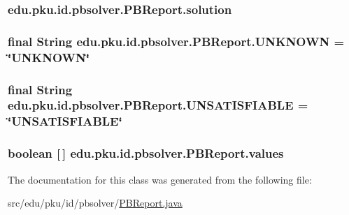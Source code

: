 \label{classedu_1_1pku_1_1id_1_1pbsolver_1_1_p_b_report_a94d85825eea60ee1d00b0b8df185b0f3}
\hypertarget{classedu_1_1pku_1_1id_1_1pbsolver_1_1_p_b_report_ab65beac0d1fd5ae85ac536441e3779a8}{
\subsubsection[{solution}]{ {\bf edu.pku.id.pbsolver.PBReport.solution}}}
\label{classedu_1_1pku_1_1id_1_1pbsolver_1_1_p_b_report_ab65beac0d1fd5ae85ac536441e3779a8}
\hypertarget{classedu_1_1pku_1_1id_1_1pbsolver_1_1_p_b_report_abf68ce33fec835012c92fa764c6b3bf9}{
\subsubsection[{UNKNOWN}]{\setlength{\rightskip}{0pt plus 5cm}final String {\bf edu.pku.id.pbsolver.PBReport.UNKNOWN} = \char`\"{}UNKNOWN\char`\"{}}}
\label{classedu_1_1pku_1_1id_1_1pbsolver_1_1_p_b_report_abf68ce33fec835012c92fa764c6b3bf9}
\hypertarget{classedu_1_1pku_1_1id_1_1pbsolver_1_1_p_b_report_ad7f88216510297f2b6b6ed96a1672ea3}{
\subsubsection[{UNSATISFIABLE}]{\setlength{\rightskip}{0pt plus 5cm}final String {\bf edu.pku.id.pbsolver.PBReport.UNSATISFIABLE} = \char`\"{}UNSATISFIABLE\char`\"{}}}
\label{classedu_1_1pku_1_1id_1_1pbsolver_1_1_p_b_report_ad7f88216510297f2b6b6ed96a1672ea3}
\hypertarget{classedu_1_1pku_1_1id_1_1pbsolver_1_1_p_b_report_a537a45fd8738f95aea6e043fb58bacfe}{
\subsubsection[{values}]{\setlength{\rightskip}{0pt plus 5cm}boolean \mbox{[}$\,$\mbox{]} {\bf edu.pku.id.pbsolver.PBReport.values}}}
\label{classedu_1_1pku_1_1id_1_1pbsolver_1_1_p_b_report_a537a45fd8738f95aea6e043fb58bacfe}


The documentation for this class was generated from the following file:\begin{DoxyCompactItemize}
\item 
src/edu/pku/id/pbsolver/\hyperlink{_p_b_report_8java}{PBReport.java}\end{DoxyCompactItemize}
